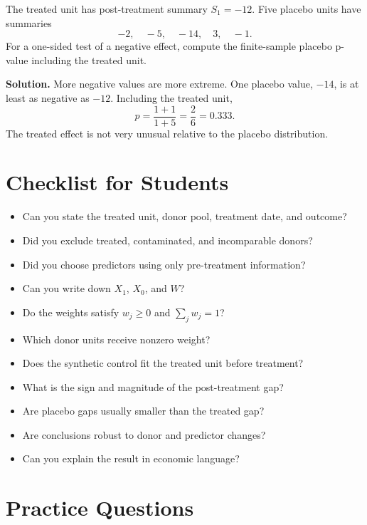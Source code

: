 The treated unit has post-treatment summary \(S_1=-12\). Five placebo units have summaries
\[
-2,\quad -5,\quad -14,\quad 3,\quad -1.
\]
For a one-sided test of a negative effect, compute the finite-sample placebo p-value including the treated unit.

\textbf{Solution.} More negative values are more extreme. One placebo value, \(-14\), is at least as negative as \(-12\). Including the treated unit,
\[
p=\frac{1+1}{1+5}=\frac{2}{6}=0.333.
\]
The treated effect is not very unusual relative to the placebo distribution.

\section{Checklist for Students}

\begin{itemize}
\item Can you state the treated unit, donor pool, treatment date, and outcome?
\item Did you exclude treated, contaminated, and incomparable donors?
\item Did you choose predictors using only pre-treatment information?
\item Can you write down \(X_1\), \(X_0\), and \(W\)?
\item Do the weights satisfy \(w_j\geq 0\) and \(\sum_jw_j=1\)?
\item Which donor units receive nonzero weight?
\item Does the synthetic control fit the treated unit before treatment?
\item What is the sign and magnitude of the post-treatment gap?
\item Are placebo gaps usually smaller than the treated gap?
\item Are conclusions robust to donor and predictor changes?
\item Can you explain the result in economic language?
\end{itemize}

\section{Practice Questions}


